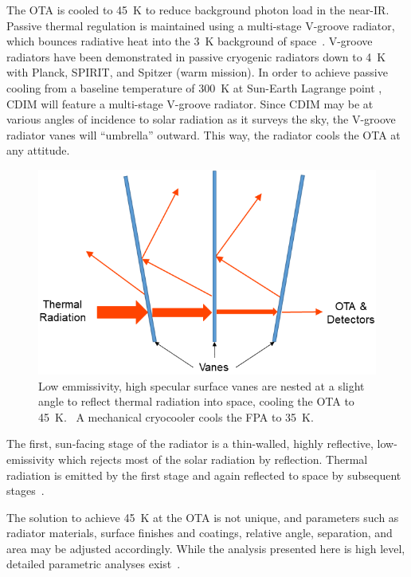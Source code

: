 \documentclass{ws-jai}
\begin{document}
The OTA is cooled to \SI{45}{\kelvin} to reduce background photon load in the near-IR.\@
Passive thermal regulation is maintained using a multi-stage V-groove radiator, which bounces radiative heat into the \SI{3}{\kelvin} background of space~\cite{bard_1987}.
V-groove radiators have been demonstrated in passive cryogenic radiators down to \SI{4}{\kelvin} with Planck, SPIRIT, and Spitzer (warm mission).\@
In order to achieve passive cooling from a baseline temperature of \SI{300}{\kelvin} at Sun-Earth Lagrange point \Ltwo, CDIM will feature a multi-stage V-groove radiator.
Since CDIM may be at various angles of incidence to solar radiation as it surveys the sky, the V-groove radiator vanes will ``umbrella'' outward.
This way, the radiator cools the OTA at any attitude.

\begin{figure}[!ht]
  \centering
  \includegraphics[width=.5\linewidth]{figs/vgroove-concept2.png}
  \caption{Low emmissivity, high specular surface vanes are nested at a slight angle to reflect thermal radiation into space, cooling the OTA to \SI{45}{\kelvin}.~\cite{rasbach1988} A mechanical cryocooler cools the FPA to \SI{35}{\kelvin}.
\label{fig:v-groove}
}
\end{figure}

The first, sun-facing stage of the radiator is a thin-walled, highly reflective, low-emissivity which rejects most of the solar radiation by reflection.
Thermal radiation is emitted by the first stage and again reflected to space by subsequent stages~\cite{gilmore2003spacecraft}.

The solution to achieve \SI{45}{\kelvin} at the OTA is not unique, and parameters such as radiator materials, surface finishes and coatings, relative angle, separation, and area may be adjusted accordingly.
While the analysis presented here is high level, detailed parametric analyses exist~\cite{couto2002radiator}.
\end{document}
